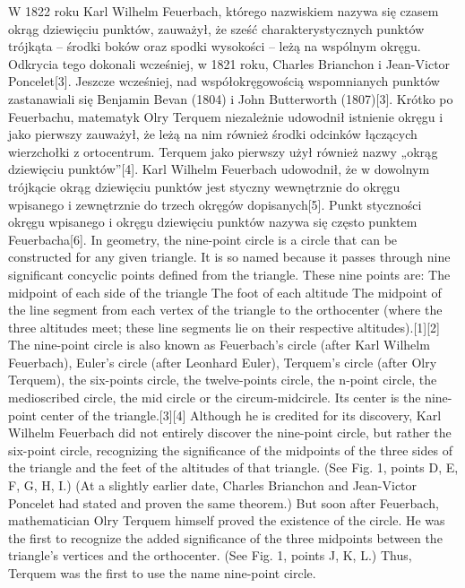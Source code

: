 \documentclass{greaseproof}
\begin{document}
W 1822 roku Karl Wilhelm Feuerbach, którego nazwiskiem nazywa się czasem okrąg dziewięciu punktów, zauważył, że sześć charakterystycznych punktów trójkąta – środki boków oraz spodki wysokości – leżą na wspólnym okręgu. Odkrycia tego dokonali wcześniej, w 1821 roku, Charles Brianchon i Jean-Victor Poncelet[3]. Jeszcze wcześniej, nad współokręgowością wspomnianych punktów zastanawiali się Benjamin Bevan (1804) i John Butterworth (1807)[3].
Krótko po Feuerbachu, matematyk Olry Terquem niezależnie udowodnił istnienie okręgu i jako pierwszy zauważył, że leżą na nim również środki odcinków łączących wierzchołki z ortocentrum. Terquem jako pierwszy użył również nazwy „okrąg dziewięciu punktów”[4].
Karl Wilhelm Feuerbach udowodnił, że w dowolnym trójkącie okrąg dziewięciu punktów jest styczny wewnętrznie do okręgu wpisanego i zewnętrznie do trzech okręgów dopisanych[5]. Punkt styczności okręgu wpisanego i okręgu dziewięciu punktów nazywa się często punktem Feuerbacha[6].
In geometry, the nine-point circle is a circle that can be constructed for any given triangle. It is so named because it passes through nine significant concyclic points defined from the triangle. These nine points are:
The midpoint of each side of the triangle
The foot of each altitude
The midpoint of the line segment from each vertex of the triangle to the orthocenter (where the three altitudes meet; these line segments lie on their respective altitudes).[1][2]
The nine-point circle is also known as Feuerbach's circle (after Karl Wilhelm Feuerbach), Euler's circle (after Leonhard Euler), Terquem's circle (after Olry Terquem), the six-points circle, the twelve-points circle, the n-point circle, the medioscribed circle, the mid circle or the circum-midcircle. Its center is the nine-point center of the triangle.[3][4]
Although he is credited for its discovery, Karl Wilhelm Feuerbach did not entirely discover the nine-point circle, but rather the six-point circle, recognizing the significance of the midpoints of the three sides of the triangle and the feet of the altitudes of that triangle. (See Fig. 1, points D, E, F, G, H, I.) (At a slightly earlier date, Charles Brianchon and Jean-Victor Poncelet had stated and proven the same theorem.) But soon after Feuerbach, mathematician Olry Terquem himself proved the existence of the circle. He was the first to recognize the added significance of the three midpoints between the triangle's vertices and the orthocenter. (See Fig. 1, points J, K, L.) Thus, Terquem was the first to use the name nine-point circle.
\end{document}
